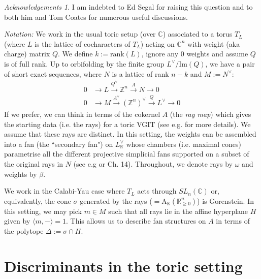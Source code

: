 \documentclass[a4paper]{article}
\theoremstyle{plain}
\theoremstyle{definition}
\theoremstyle{remark}
\newtheorem*{ack}{Acknowledgements}
\begin{document}
\begin{ack}
I am indebted to Ed Segal for raising this question and to both him and Tom Coates for numerous useful discussions.
\end{ack}

\emph{Notation:}
We work in the usual toric setup (over $\mathbb{C}$) associated to a torus $T_L$ (where $L$ is the lattice of cocharacters of $T_L$) acting on $\mathbb{C}^n$ with weight (aka charge) matrix $Q$. We define $k:=\text{rank}(L)$, ignore any 0 weights and assume $Q$ is of full rank. Up to orbifolding by the finite group $L^{\vee}/\text{Im}(Q)$, we have a pair of short exact sequences, where $N$ is a lattice of rank $n-k$ and $M:=N^{\vee}$:
\begin{align}
0 & \rightarrow L  \xrightarrow{Q^{\vee}} \mathbb{Z}^n  \xrightarrow{A} N   \rightarrow 0 \nonumber \\
0 & \rightarrow M  \xrightarrow{A^{\vee}} (\mathbb{Z}^n)^{\vee}  \xrightarrow{Q} L^{\vee}  \rightarrow 0 
\label{ToricData}
\end{align}
If we prefer, we can think in terms of the cokernel $A$ (the \textit{ray map}) which gives the starting data (i.e. the rays) for a toric VGIT (see e.g. \cite{DH} for more details). We assume that these rays are distinct. In this setting, the weights can be assembled into a fan (the ``secondary fan") on $L^{\vee}_{\mathbb{R}}$ whose chambers (i.e. maximal cones) parametrise all the different projective simplicial fans supported on a subset of the original rays in $N$ (see e.g \cite{DH} or \cite{CLS} Ch. 14). Throughout, we denote rays by $\omega$ and weights by $\beta$.


We work in the Calabi-Yau case  where $T_L$ acts through $SL_n(\mathbb{C})$ or, equivalently, the cone $\sigma$ generated by the rays ($=\text{A}_{\mathbb{R}}(\mathbb{R}_{\geq 0}^n)$) is Gorenstein. In this setting, we may pick $m \in M$ such that all rays lie in the affine hyperplane $H$ given by $\langle m,- \rangle =1$. This allows us to describe fan structures on $A$ in terms of the polytope $\Delta:=\sigma \cap H$. 


\section{Discriminants in the toric setting}
\end{document}
